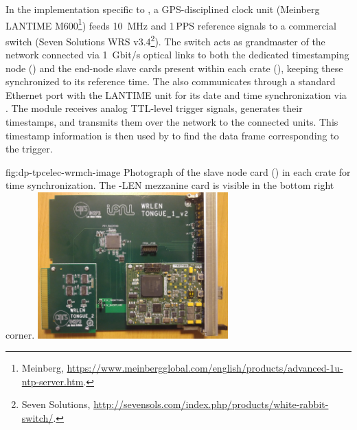 In the implementation specific to , a GPS-disciplined clock unit (Meinberg LANTIME M600\footnote{Meinberg\texttrademark{}, \url{https://www.meinbergglobal.com/english/products/advanced-1u-ntp-server.htm}.}) feeds \SI{10}{MHz} and \num{1}\,PPS reference signals to a commercial  switch (Seven Solutions WRS v3.4\footnote{Seven Solutions\texttrademark{}, \url{http://sevensols.com/index.php/products/white-rabbit-switch/}.}). The switch acts as grandmaster of the  network connected via \SI{1}{Gbit/s} optical links to both the dedicated  timestamping node () and the  end-node slave cards present within each  crate (), keeping these synchronized to its reference time. The  also communicates through a standard Ethernet port with the LANTIME unit for its date and time synchronization via . The  module receives analog TTL-level trigger signals, generates their timestamps, and transmits them over the  network to the connected  units. This timestamp information is then used by  to find the data frame corresponding to the trigger.  

\begin{dunefigure}{fig:dp-tpcelec-wrmch-image}
{Photograph of the  slave node card () in each  crate for time synchronization. The -LEN mezzanine card is visible in the bottom right corner.}
\includegraphics[width=0.55\textwidth]{graphics/dp-tpcelec-wrmch-image}
\end{dunefigure}

